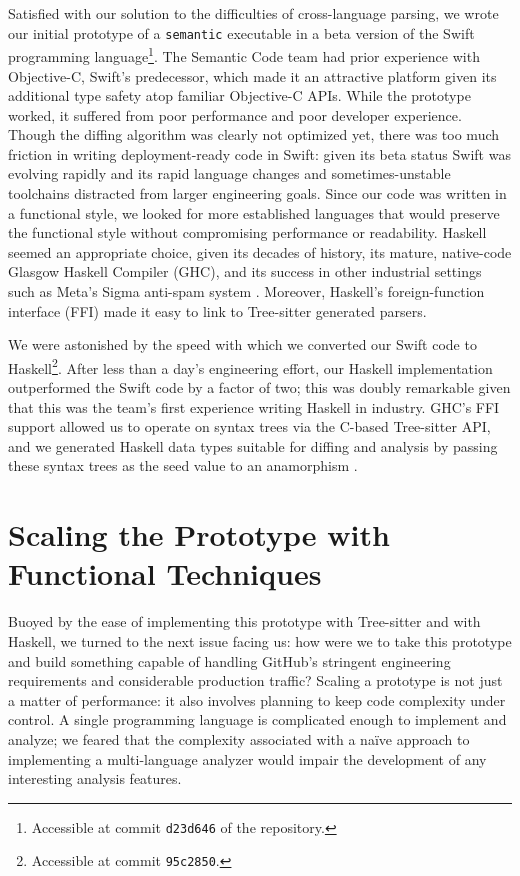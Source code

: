 \documentclass[acmsmall,fleqn]{acmart}
\begin{document}
Satisfied with our solution to the difficulties of cross-language parsing,
we wrote our initial prototype of a \texttt{semantic} executable in a beta
version of the Swift programming language\footnote{Accessible at commit
  \texttt{d23d646} of the \semantic{} repository.}. The Semantic Code team
had prior experience with Objective-C, Swift’s predecessor, which made it an
attractive platform given its additional type safety atop familiar
Objective-C APIs. While the prototype worked, it suffered from poor
performance and poor developer experience. Though the diffing algorithm was
clearly not optimized yet, there was too much friction in writing
deployment-ready code in Swift: given its beta status Swift was evolving
rapidly and its rapid language changes and sometimes-unstable toolchains
distracted from larger engineering goals. Since our code was written in a
functional style, we looked for more established languages that would
preserve the functional style without compromising performance or
readability. Haskell seemed an appropriate choice, given its decades of
history, its mature, native-code Glasgow Haskell Compiler (GHC), and its
success in other industrial settings such as Meta’s Sigma anti-spam system
\cite{marlow15spam,marlow14fork}. Moreover, Haskell’s foreign-function
interface (FFI) made it easy to link to Tree-sitter generated parsers.

We were astonished by the speed with which we converted our Swift code to
Haskell\footnote{Accessible at commit \texttt{95c2850}.}. After less
than a day’s engineering effort, our Haskell implementation outperformed the
Swift code by a factor of two; this was doubly remarkable given that this was
the team’s first experience writing Haskell in industry. GHC’s FFI support
allowed us to operate on syntax trees via the C-based Tree-sitter API, and we
generated Haskell data types suitable for diffing and analysis by passing these
syntax trees as the seed value to an anamorphism \cite{Meijer91Bananas}.

\section{Scaling the Prototype with Functional Techniques}
\label{sec:scaling}

Buoyed by the ease of implementing this prototype with Tree-sitter and with
Haskell, we turned to the next issue facing us: how were we to take this
prototype and build something capable of handling GitHub’s stringent engineering
requirements and considerable production traffic? Scaling a prototype is not
just a matter of performance: it also involves planning to keep code complexity
under control. A single programming language is complicated enough to implement
and analyze; we feared that the complexity associated with a naïve approach to
implementing a multi-language analyzer would impair the development of any
interesting analysis features.
\end{document}
